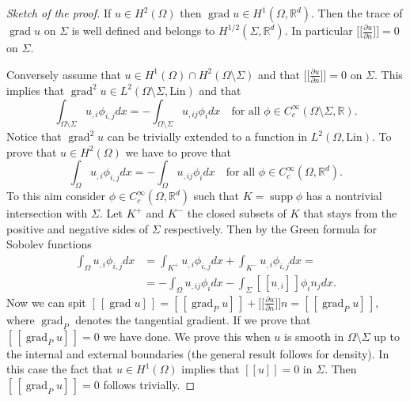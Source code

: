 \documentclass[a4paper,10pt,oneside]{amsbook}
\numberwithin{section}{chapter}
\numberwithin{equation}{chapter}
\theoremstyle{definition}
\DeclareMathOperator{\supp}{supp}
\DeclareMathOperator{\grad}{grad}
\newcommand{\dind}[2]{\frac{\partial #1}{\partial #2}}
\begin{document}
\begin{proof}[Sketch of the proof]
If $u\in H^2(\Omega)$ then $\grad u\in H^1(\Omega,\mathbb{R}^d)$. Then the trace of $\grad u$ on $\Sigma$ is well defined and belongs to $H^{1/2}(\Sigma,\mathbb{R}^d)$. In particular $\big[\!\!\big[\dind{u}{n}\big]\!\!\big]=0$ on $\Sigma$.

Conversely assume that $u\in H^1(\Omega)\cap H^2(\Omega\setminus\Sigma)$ and that $\big[\!\!\big[\dind{u}{n}\big]\!\!\big]=0$ on $\Sigma$. This implies that $\grad^2 u\in L^2(\Omega\setminus\Sigma,\text{Lin})$ and that
\[
\int_{\Omega\setminus\Sigma} u_{,i}\phi_{i,j}dx=-\int_{\Omega\setminus\Sigma} u_{,ij}\phi_idx\quad\text{for all $\phi\in C^\infty_c(\Omega\setminus\Sigma,\mathbb{R})$}.
\]
Notice that $\grad^2 u$ can be trivially extended to a function in $L^2(\Omega,\text{Lin})$. To prove that $u\in H^2(\Omega)$ we have to prove that
\[
\int_{\Omega} u_{,i}\phi_{i,j}dx=-\int_{\Omega} u_{,ij}\phi_{i}dx\quad\text{for all $\phi\in C^\infty_c(\Omega,\mathbb{R}^d)$}.
\]
To this aim consider $\phi\in C^\infty_c(\Omega,\mathbb{R}^d)$ such that $K=\supp\phi$ has a nontrivial intersection with $\Sigma$. Let $K^+$ and $K^-$ the closed subsets of $K$ that stays from the positive and negative sides of $\Sigma$ respectively. Then by the Green formula for Sobolev functions
\[
\begin{split}
\int_{\Omega} u_{,i}\phi_{i,j}dx&=\int_{K^+} u_{,i}\phi_{i,j}dx+\int_{K^-} u_{,i}\phi_{i,j}dx=\\
&=-\int_{\Omega} u_{,ij}\phi_{i}dx-\int_\Sigma[\!\!\,[u_{,i}]\,\!\!]\phi_{i}n_jdx.
\end{split}
\]
Now we can spit $[\!\!\,[\grad u]\,\!\!]=[\!\!\,[\grad_P u]\,\!\!]+\big[\!\!\big[\dind{u}{n}\big]\!\!\big]n=[\!\!\,[\grad_P u]\,\!\!]$, where $\grad_P$ denotes the tangential gradient. If we prove that $[\!\!\,[\grad_P u]\,\!\!]=0$ we have done. We prove this when $u$ is smooth in $\Omega\setminus\Sigma$ up to the internal and external boundaries (the general result follows for density). In this case the fact that $u\in H^1(\Omega)$ implies that $[\![u]\!]=0$ in $\Sigma$. Then $[\!\!\,[\grad_P u]\,\!\!]=0$ follows trivially.
\end{proof}
\end{document}
